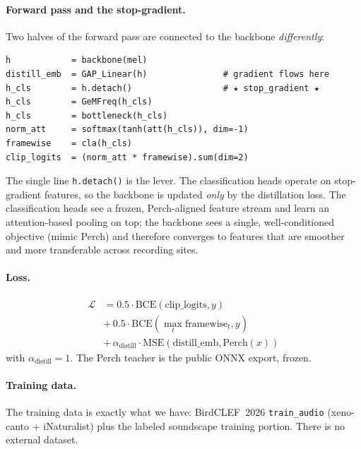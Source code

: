 \paragraph{Forward pass and the stop-gradient.}
Two halves of the forward pass are connected to the backbone
\emph{differently}:
\begin{verbatim}
h            = backbone(mel)
distill_emb  = GAP_Linear(h)               # gradient flows here
h_cls        = h.detach()                  # ★ stop_gradient ★
h_cls        = GeMFreq(h_cls)
h_cls        = bottleneck(h_cls)
norm_att     = softmax(tanh(att(h_cls)), dim=-1)
framewise    = cla(h_cls)
clip_logits  = (norm_att * framewise).sum(dim=2)
\end{verbatim}
The single line \texttt{h.detach()} is the lever. The
classification heads operate on stop-gradient features, so the
backbone is updated \emph{only} by the distillation loss. The
classification heads see a frozen, Perch-aligned feature stream
and learn an attention-based pooling on top; the backbone sees a
single, well-conditioned objective (mimic Perch) and therefore
converges to features that are smoother and more transferable
across recording sites.

\paragraph{Loss.}
\begin{align*}
\mathcal{L} &=
0.5 \cdot \mathrm{BCE}(\text{clip\_logits}, y) \\
&+\, 0.5 \cdot \mathrm{BCE}(\max_t \text{framewise}_t, y) \\
&+\, \alpha_\text{distill} \cdot \mathrm{MSE}(\text{distill\_emb},
   \text{Perch}(x))
\end{align*}
with $\alpha_\text{distill} = 1$. The Perch teacher is the public
ONNX export, frozen.

\paragraph{Training data.}
The training data is exactly what we have: BirdCLEF~2026
\texttt{train\_audio} (xeno-canto + iNaturalist) plus the labeled
soundscape training portion. There is no external dataset.

